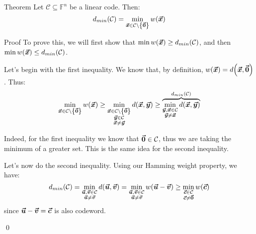 \documentclass[a4paper]{article}
\begin{document}
\begin{parag}{Theorem}
    Let $\mathcal{C} \subseteq \mathbb{F}^n$ be a linear code. Then: 
    \[d_{min}\left(\mathcal{C}\right) = \min_{\bvec{x} \in \mathcal{C} \setminus \left\{\bvec{0}\right\}} w\left(\bvec{x}\right)\]

    \begin{subparag}{Proof}
        To prove this, we will first show that $\min w\left(\bvec{x}\right) \geq d_{min}\left(\mathcal{C}\right)$, and then $\min w\left(\bvec{x}\right) \leq d_{min}\left(\mathcal{C}\right)$.

        Let's begin with the first inequality. We know that, by definition, $w\left(\bvec{x}\right) = d\left(\bvec{x}, \bvec{0}\right)$. Thus:
        \[\min_{\bvec{x} \in \mathcal{C} \setminus \left\{\bvec{0}\right\}} w\left(\bvec{x}\right) \geq \min_{\substack{\bvec{x} \in \mathcal{C} \setminus \left\{\bvec{0}\right\} \\ \bvec{y} \in \mathcal{C} \\ \bvec{x} \neq \bvec{y}}} d\left(\bvec{x}, \bvec{y}\right) \geq \overbrace{\min_{\substack{\bvec{y}, \bvec{x} \in \mathcal{C} \\ \bvec{y} \neq \bvec{x}}} d\left(\bvec{x}, \bvec{y}\right)}^{d_{min}\left(\mathcal{C}\right)}\]

        Indeed, for the first inequality we know that $\bm{\protect\vec{0}} \in\mathcal{C}$, thus we are taking the minimum of a greater set. This is the same idea for the second inequality.

        \vspace{1.5em}

        Let's now do the second inequality. Using our Hamming weight property, we have:
        \[d_{min}\left(\mathcal{C}\right) = \min_{\substack{\bvec{u}, \bvec{v} \in \mathcal{C} \\ \bvec{u} \neq \bvec{v}}} d\left(\bvec{u}, \bvec{v}\right) = \min_{\substack{\bvec{u}, \bvec{v} \in \mathcal{C} \\ \bvec{u} \neq \bvec{v}}} w\left(\bvec{u} - \bvec{v}\right) \geq \min_{\substack{\bvec{c} \in \mathcal{C} \\ \bvec{c} \neq \bvec{0}}} w\left(\bvec{c}\right)\]
        since $\bm{\protect\vec{u}} - \bm{\protect\vec{v}} = \bm{\protect\vec{c}}$ is also codeword.

        \qed
    \end{subparag}
\end{parag}
\end{document}
